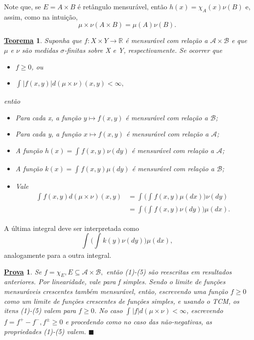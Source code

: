 \documentclass{article}
\newtheorem*{theorem*}{\underline{Teorema}}
\newtheorem*{proof*}{\underline{Prova}}
\renewcommand\qedsymbol{$\blacksquare$}
\begin{document}
  Note que, se \(E = A\times B\) é retângulo mensurável, então \(h(x) = \chi_{A}(x)\nu(B)\) e, assim, como na intuição, 
    \[
      \mu \times \nu(A\times B) = \mu (A) \nu(B).
    \]
    \hypertarget{fubini_tonelli}{
   \begin{theorem*}
     Suponha que \(f:X\times Y\rightarrow \mathbb{R}\) é mensurável com relação a \(\mathcal{A}\times \mathcal{B}\) e que \(\mu \) e \(\nu\) são medidas \(\sigma \)-finitas sobre X e Y, respectivamente. Se ocorrer que 
    \begin{itemize}
      \item[a)] \(f\geq 0\), ou 
        \item[b)] \(\int_{}|f(x, y)| d(\mu\times \nu_{})(x, y) < \infty,\)
    \end{itemize}
    então 
   \begin{itemize}
     \item[1)] Para cada x, a função \(y\mapsto f(x, y)\) é mensurável com relação a \(\mathcal{B}\);
       \item[2)] Para cada y, a função \(x\mapsto f(x, y)\) é mensurável com relação a \(\mathcal{A}\);
         \item[3)] A função \(h(x) = \int_{}f(x, y)\nu( dy)\) é mensurável com relação a \(\mathcal{A}\);
         \item[4)] A função \(k(x) = \int_{}f(x, y)\mu( dy)\) é mensurável com relação a \(\mathcal{B}\);
           \item[5)] Vale 
            \begin{align*}
              \int_{}f(x, y) d(\mu\times \nu)(x, y)_{} &= \int_{}\biggl(\int_{}^{}f(x, y)\mu (dx)\biggr) \nu(dy)\\ 
                                                       &= \int_{}^{}\biggl(\int_{}^{}f(x, y)\nu(dy)\biggr)\mu (dx).
            \end{align*}
   \end{itemize} 
   \end{theorem*}}
  A última integral deve ser interpretada como 
    \[
      \int_{}^{}\biggl(\int_{}^{}k(y)\nu(dy)\biggr)\mu (dx),
    \]
  analogamente para a outra integral. 
 \begin{proof*}
   Se \(f = \chi_{E}, E\subseteq \mathcal{A}\times \mathcal{B},\) então (1)-(5) são reescritas em resultados anteriores. 
Por linearidade, vale para f simples. Sendo o limite de funções mensuráveis crescentes também mensurável, então, escrevendo uma função \(f\geq 0\) como um limite de funções crescentes de funções 
simples, e usando o TCM, os itens (1)-(5) valem para \(f\geq 0\). No caso \(\int_{}|f| d(\mu\times\nu_{}) < \infty\), escrevendo \(f=f^{+}-f^{-}, f^{\pm}\geq 0\) e procedendo como no caso das não-negativas,
as propriedades (1)-(5) valem. \qedsymbol
 \end{proof*}
\end{document}
